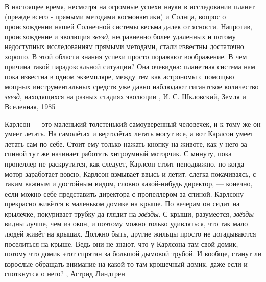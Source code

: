 В настоящее время, несмотря на огромные успехи науки в исследовании планет
(прежде всего - прямыми методами космонавтики) и Солнца, вопрос о происхождении
нашей Солнечной системы весьма далек от ясности. Напротив, происхождение и
эволюция \emph{звезд}, несравненно более удаленных и потому недоступных
исследованиям прямыми методами, стали известны достаточно хорошо. В этой
области знания успехи просто поражают воображение. В чем причина такой
парадоксальной ситуации? Она очевидна: планетная система нам пока известна в
одном экземпляре, между тем как астрономы с помощью мощных инструментальных
средств уже давно наблюдают гигантское количество \emph{звезд}, находящихся на
разных стадиях эволюции
, И. С. Шкловский, Земля и Вселенная, 1985


Карлсон — это маленький толстенький самоуверенный человечек, и к тому же он
умеет летать. На самолётах и вертолётах летать могут все, а вот Карлсон умеет
летать сам по себе. Стоит ему только нажать кнопку на животе, как у него за
спиной тут же начинает работать хитроумный моторчик. С минуту, пока пропеллер
не раскрутится, как следует, Карлсон стоит неподвижно, но когда мотор
заработает вовсю, Карлсон взмывает ввысь и летит, слегка покачиваясь, с таким
важным и достойным видом, словно какой-нибудь директор, — конечно, если можно
себе представить директора с пропеллером за спиной.  Карлсону прекрасно живётся
в маленьком домике на крыше. По вечерам он сидит на крылечке, покуривает трубку
да глядит на \emph{звёзды}. С крыши, разумеется, \emph{звёзды} видны лучше, чем
из окон, и поэтому можно только удивляться, что так мало людей живёт на крышах.
Должно быть, другие жильцы просто не догадываются поселиться на крыше. Ведь они
не знают, что у Карлсона там свой домик, потому что домик этот спрятан за
большой дымовой трубой. И вообще, станут ли взрослые обращать внимание на
какой-то там крошечный домик, даже если и споткнутся о него?
, Астрид Линдгрен
